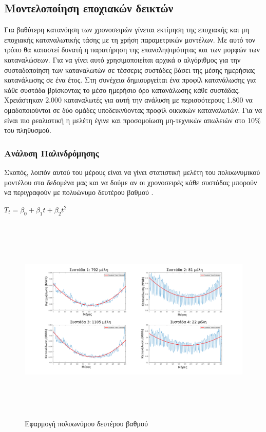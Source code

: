 \subsection{Μοντελοποίηση εποχιακών δεικτών}
\label{sec:statisticalexplore}
Για βαθύτερη κατανόηση των χρονοσειρών γίνεται εκτίμηση της εποχιακής και μη εποχιακής καταναλωτικής τάσης με τη χρήση παραμετρικών μοντέλων. Με αυτό τον τρόπο θα καταστεί δυνατή η παρατήρηση της επαναληψιμότητας και των μορφών των καταναλώσεων. Για να γίνει αυτό χρησιμοποιείται αρχικά ο αλγόριθμος  για την συσταδοποίηση των καταναλωτών σε τέσσερις συστάδες βάσει της μέσης ημερήσιας κατανάλωσης σε ένα έτος. Στη συνέχεια δημιουργείται ένα προφίλ κατανάλωσης για κάθε συστάδα βρίσκοντας το μέσο ημερήσιο όρο κατανάλωσης κάθε συστάδας. Χρειάστηκαν 2.000 καταναλωτές για αυτή την ανάλυση με περισσότερους  1.800 να ομαδοποιούνται σε δύο ομάδες υποδεικνύοντας προφίλ οικιακών καταναλωτών. Για να είναι πιο ρεαλιστική η μελέτη έγινε και προσομοίωση μη-τεχνικών απωλειών στο 10\% του πληθυσμού.
\subsubsection{Ανάλυση Παλινδρόμησης}
Σκοπός, λοιπόν αυτού του μέρους είναι να γίνει στατιστική μελέτη του πολυωνυμικού μοντέλου στα δεδομένα μας και να δούμε αν οι χρονοσειρές κάθε συστάδας μπορούν να περιγραφούν  με πολυώνυμο δευτέρου βαθμού \cite{mathworkstrend}. \par
\begin{center}
$T_t=\beta_0 + \beta_1t + \beta_2t^2$
\end{center}

\begin{figure}[ht!]
\centering
\includegraphics[width=180mm, height=100mm]{../../plots/Trend_estimation/gr_quadratic_Trend_ALL.png}
\caption{Εφαρμογή πολυωνύμου δευτέρου  βαθμού}
\label{fig:quadratic trend}
\end{figure}


